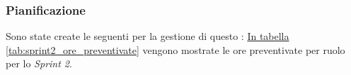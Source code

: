 \subsubsection{Pianificazione}

Sono state create le seguenti  per la gestione di questo : 
\hyperref[tab:sprint2_ore_preventivate]{In tabella \ref{tab:sprint2_ore_preventivate}} vengono mostrate le ore preventivate per ruolo per lo \textit{Sprint 2}.

\begin{table}[H]
    \centering
    \caption{Ore preventivate per ruolo Sprint 2}
    \label{tab:sprint2_ore_preventivate}
\end{table}